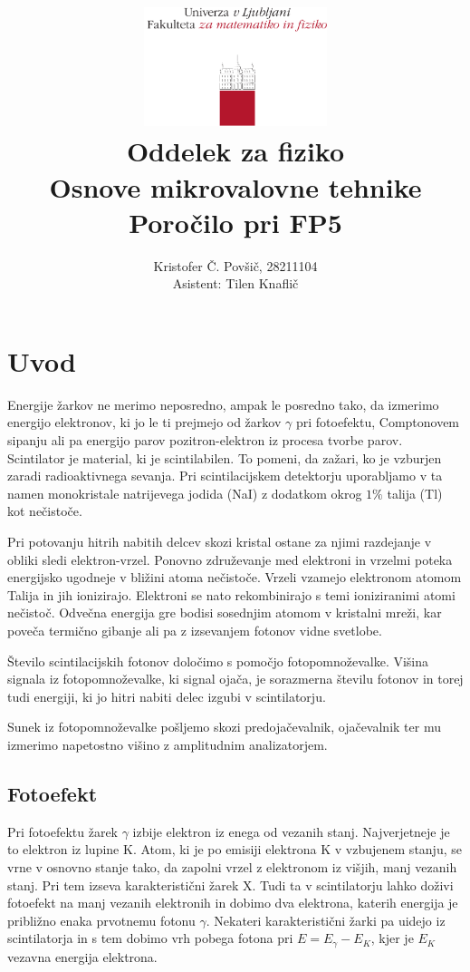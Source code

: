 \documentclass[11pt]{article}
\title{
  \includegraphics[width=0.4\textwidth]{fmf_logo}\\
  {\small Oddelek za fiziko} \\
  {Osnove mikrovalovne tehnike}\\
  {\small Poročilo pri FP5}\\

}
\date{}
\author{ Kristofer Č. Povšič, 28211104 \\[5 cm]
 \small  Asistent: Tilen Knaflič \\
}
\begin{document}
\maketitle
\tableofcontents

\section{Uvod}\label{sec:orge7c61fa}

Energije žarkov ne merimo neposredno, ampak le posredno tako, da izmerimo energijo elektronov, ki jo le ti prejmejo od žarkov \(\gamma\) pri fotoefektu, Comptonovem sipanju ali pa energijo parov pozitron-elektron iz procesa tvorbe parov. Scintilator
je material, ki je scintilabilen. To pomeni, da zažari, ko je vzburjen zaradi
radioaktivnega sevanja. Pri scintilacijskem detektorju uporabljamo v ta namen monokristale natrijevega jodida (NaI) z dodatkom okrog \(1 \%\) talija (Tl) kot nečistoče.

Pri potovanju hitrih nabitih delcev skozi kristal ostane za njimi razdejanje v obliki sledi elektron-vrzel. Ponovno združevanje med elektroni in vrzelmi poteka energijsko ugodneje v bližini atoma nečistoče. Vrzeli vzamejo elektronom atomom Talija in jih ionizirajo. Elektroni se nato rekombinirajo s temi ioniziranimi atomi nečistoč. Odvečna energija gre bodisi sosednjim atomom v kristalni mreži, kar poveča termično gibanje ali pa z izsevanjem fotonov vidne svetlobe.

Število scintilacijskih fotonov določimo s pomočjo fotopomnoževalke. Višina signala iz fotopomnoževalke, ki signal ojača, je sorazmerna številu fotonov in torej tudi energiji, ki jo hitri nabiti delec izgubi v scintilatorju.

Sunek iz fotopomnoževalke pošljemo skozi predojačevalnik, ojačevalnik ter mu izmerimo napetostno višino z amplitudnim analizatorjem.
\subsection{Fotoefekt}\label{sec:orgf12cecc}

Pri fotoefektu žarek \(\gamma\) izbije elektron iz enega od vezanih stanj. Najverjetneje je to elektron iz lupine K. Atom, ki je po emisiji elektrona K v vzbujenem stanju, se vrne v osnovno stanje tako, da zapolni vrzel z elektronom iz višjih, manj vezanih stanj.
Pri tem izseva karakteristični žarek X. Tudi ta v scintilatorju lahko doživi
fotoefekt na manj vezanih elektronih in dobimo dva elektrona, katerih
energija je približno enaka prvotnemu fotonu \(\gamma\). Nekateri
karakteristični žarki pa uidejo iz
scintilatorja in s tem dobimo vrh pobega fotona pri \(E = E_{\gamma} - E_K\),
kjer je \(E_K\) vezavna energija elektrona.
\end{document}
